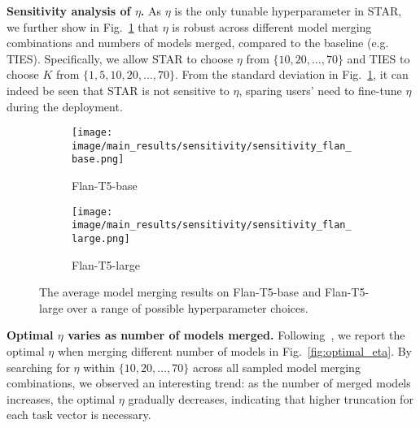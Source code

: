 \noindent\textbf{Sensitivity analysis of $\eta$.} As \(\eta\) is the only tunable hyperparameter in STAR, we further show in 
Fig.~\ref{fig:eta_analysis1} that \(\eta\) is robust across different model merging combinations and numbers of models merged, compared to the baseline (e.g. TIES).
Specifically, we allow STAR to choose $\eta$ from $\{10, 20, \dots, 70\}$ and TIES to choose $K$ from $\{1, 5, 10, 20, \dots, 70\}$. From the standard deviation in Fig.~\ref{fig:eta_analysis1}, it can indeed be seen that STAR is not sensitive to $\eta$, sparing users' need to fine-tune $\eta$ during the deployment.
\begin{figure}[t]
\begin{subfigure}{0.48\textwidth}
\texttt{[image: image/main\_results/sensitivity/sensitivity\_flan\_base.png]} 
\caption{Flan-T5-base}
\end{subfigure}
\begin{subfigure}{0.48\textwidth}
\texttt{[image: image/main\_results/sensitivity/sensitivity\_flan\_large.png]}
\caption{Flan-T5-large}
\end{subfigure}
\caption{The average model merging results on Flan-T5-base and Flan-T5-large over a range of possible hyperparameter choices.}
\label{fig:eta_analysis1}
\end{figure}

\noindent\textbf{Optimal $\eta$ varies as number of models merged.} Following~\citet{ilharco2022editing}, we report the optimal $\eta$ when merging different number of models in Fig.~\ref{fig:optimal_eta}. By searching for \( \eta \) within \(\{10, 20, \dots, 70\}\) across all sampled model merging combinations, we observed an interesting trend: as the number of merged models increases, the optimal \( \eta \) gradually decreases, indicating that higher truncation for each task vector is necessary. 













